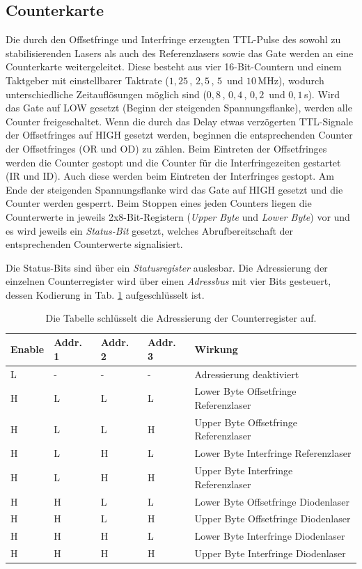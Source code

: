 \subsection{Counterkarte}\label{subsec:counterkarte}
Die durch den Offsetfringe und Interfringe erzeugten
TTL-Pulse des sowohl zu stabilisierenden Lasers als auch des Referenzlasers
sowie das Gate werden an eine Counterkarte weitergeleitet. Diese besteht aus
vier 16-Bit-Countern und einem Taktgeber mit einstellbarer Taktrate ($1,25\,$,
$2,5\,$, $5\,$ und $10\,$MHz), wodurch unterschiedliche Zeitauflösungen möglich
sind ($0,8\,$, $0,4\,$, $0,2\,$ und $0,1\,$\textmu s).
Wird das Gate auf LOW gesetzt (Beginn der steigenden Spannungsflanke), werden
alle Counter freigeschaltet. Wenn die durch
das Delay etwas verzögerten TTL-Signale der Offsetfringes auf HIGH gesetzt werden, beginnen die
entsprechenden Counter der Offsetfringes (OR und OD) zu zählen. Beim Eintreten
der Offsetfringes werden die Counter gestopt und die Counter für die
Interfringezeiten gestartet (IR und ID). Auch diese werden beim Eintreten der
Interfringes gestopt. Am Ende der steigenden Spannungsflanke wird das Gate auf
HIGH gesetzt und die Counter werden gesperrt. Beim Stoppen eines jeden Counters
liegen die Counterwerte in jeweils 2x8-Bit-Registern (\textit{Upper Byte} und \textit{Lower Byte}) vor und es wird jeweils ein
\textit{Status-Bit} gesetzt, welches Abrufbereitschaft der entsprechenden
Counterwerte signalisiert.\par
Die Status-Bits sind über ein \textit{Statusregister} auslesbar. Die
Adressierung der einzelnen Counterregister wird über einen \textit{Adressbus} mit vier Bits
gesteuert, dessen Kodierung in Tab. \ref{tab:adressbus_kodierung} aufgeschlüsselt ist.
\begin{table}
	\begin{tabular}{p{}p{}p{}p{}|p{}}
		\toprule
		Enable & Addr. 1 & Addr. 2 & Addr. 3 & Wirkung\\
		\midrule[1px]
		\hline
		L & - & - & - & Adressierung deaktiviert\\
		H & L & L & L & Lower Byte Offsetfringe Referenzlaser\\
		H & L & L & H & Upper Byte Offsetfringe Referenzlaser\\
		H & L & H & L & Lower Byte Interfringe Referenzlaser\\
		H & L & H & H & Upper Byte Interfringe Referenzlaser\\
		H & H & L & L & Lower Byte Offsetfringe Diodenlaser\\
		H & H & L & H & Upper Byte Offsetfringe Diodenlaser\\
		H & H & H & L & Lower Byte Interfringe Diodenlaser\\
		H & H & H & H & Upper Byte Interfringe Diodenlaser\\
		\bottomrule[1px]
	\end{tabular}
	\caption[Adressierung Counterregister]{Die Tabelle schlüsselt die Adressierung
	der Counterregister auf.}
	\label{tab:adressbus_kodierung}
\end{table}
